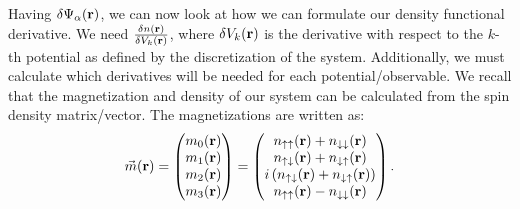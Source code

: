 \documentclass[10pt]{revtex4-1}
\newcommand{\bfr}{{\bf r}}
\newcommand{\ua}{\uparrow}
\newcommand{\da}{\downarrow}
\begin{document}
Having $\delta \Psi_{\alpha}(\bfr)$, we can now look at how we can formulate our density functional derivative.
We need $\frac{\delta n(\bfr)}{\delta V_k(\bfr)}$, where $\delta V_k(\bfr)$ is the derivative with respect to the $k$-th potential as defined by the discretization of the system.
Additionally, we must calculate which derivatives will be needed for each potential/observable.
We recall that the magnetization and density of our system can be calculated from the spin density matrix/vector.
The magnetizations are written as:
\begin{equation}
  \vec{m}(\bfr) =
  \begin{pmatrix}
    m_0(\bfr) \\
    m_1(\bfr) \\
    m_2(\bfr) \\
    m_3(\bfr) \\
  \end{pmatrix}
  =
  \begin{pmatrix}
    n_{\ua \ua}(\bfr) + n_{\da \da}(\bfr) \\
    n_{\ua \da}(\bfr) + n_{\da \ua}(\bfr) \\
    i\left(n_{\ua \da}(\bfr) + n_{\da \ua}(\bfr)\right) \\
    n_{\ua \ua}(\bfr) - n_{\da \da}(\bfr) \\
  \end{pmatrix}
  .
\end{equation}
\end{document}
